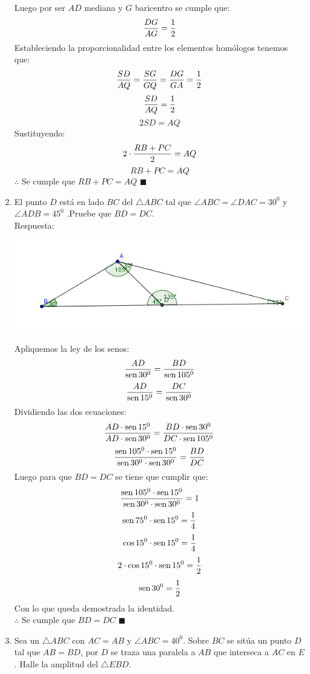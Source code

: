 \documentclass{book}
\newcommand{\sen}{\mathop{\rm sen}\nolimits} %
\begin{document}
\begin{enumerate}
          Luego por ser $AD$ mediana y $G$ baricentro se cumple que:
          $${DG\over AG}={1\over 2}$$
          Estableciendo la proporcionalidad entre los elementos homólogos tenemos que:
          $${SD\over AQ}={SG\over GQ}={DG\over GA}={1\over 2}$$
          $${SD\over AQ}={1\over 2}$$
          $$2SD=AQ$$
          Sustituyendo:
          $$2\cdot{RB+PC\over 2}=AQ$$
          $$RB+PC=AQ$$
          $\therefore$ Se cumple que $RB+PC=AQ$ $\blacksquare$\\
    \item El punto $D$ está en lado $BC$ del $\triangle ABC$ tal que $\angle ABC = \angle DAC = 30^0$  y $ \angle ADB = 45^0$  .Pruebe que  $BD = DC$. \\
          Respuesta:
          \begin{center}
              \includegraphics[scale=1]{imagenes/Geometria/6.png}
          \end{center}
          Apliquemos la ley de los senos:
          $$\frac{AD}{\sen{30^0}} =\frac{BD}{\sen{105^0} } $$
          $$\frac{AD}{\sen{15^0}} =\frac{DC}{\sen{30^0} }$$
          Dividiendo las dos ecuaciones:
          $$\frac{AD\cdot\sen{15^0}}{AD\cdot\sen{30^0}}=\frac{BD\cdot\sen{30^0}}{DC\cdot\sen{105^0} } $$
          $$\frac{\sen{105^0}\cdot\sen{15^0}}{\sen{30^0}\cdot\sen{30^0}}=\frac{BD}{DC} $$
          Luego para que $BD= DC$ se tiene que cumplir que:
          $$\frac{\sen{105^0}\cdot\sen{15^0}}{\sen{30^0}\cdot\sen{30^0}}=1 $$
          $$\sen{75^0}\cdot\sen{15^0}={1\over 4}$$
          $$\cos{15^0}\cdot\sen{15^0}={1\over 4}$$
          $$2\cdot\cos{15^0}\cdot\sen{15^0}={1\over 2}$$
          $$\sen{30^0}={1\over 2}$$
          Con lo que queda demostrada la identidad.\\
          $\therefore$ Se cumple que $BD= DC$ $\blacksquare$\\
    \item Sea un $\triangle ABC$ con $AC=AB$ y $\angle ABC = 40^0$. Sobre $BC$ se sitúa un punto $D$ tal que $AB=BD$, por $D$ se traza una paralela a $AB$ que interseca a $AC$ en $E$. Halle la amplitud del $\triangle EBD$.\\

\end{enumerate}
\end{document}
